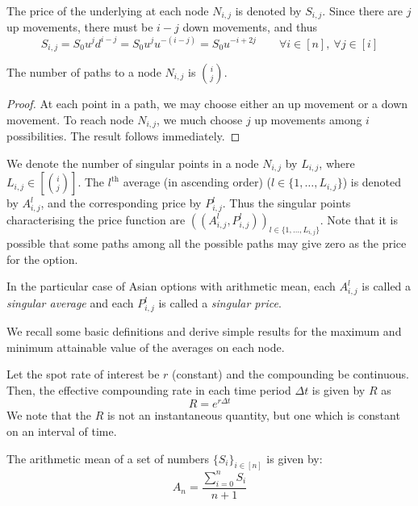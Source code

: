 The price of the underlying at each node $ N_{i,j} $ is denoted by $ S_{i,j} $. Since there are $j$ up movements, there must be $ i-j $ down movements, and thus
\begin{equation} \label{eq:asian-am-ij}
	S_{i,j} = S_0 u^{j} d^{i-j} = S_0 u^{j} u^{-(i-j)} = S_0 u^{-i+2j} \qquad \forall i \in [n], \ \forall j \in [i]
\end{equation}


\begin{prp}
	The number of paths to a node $ N_{i,j} $ is $ \binom{i}{j} $.
\end{prp}

\begin{proof}
	At each point in a path, we may choose either an up movement or a down movement. To reach node $ N_{i,j} $, we much choose $j$ up movements among $i$ possibilities. The result follows immediately.
\end{proof}


We denote the number of singular points in a node $ N_{i,j} $ by $ L_{i,j} $, where $ L_{i,j} \in \left[ \binom{i}{j} \right] $. The $ l^\mathrm{th} $ average (in ascending order) ($ l \in \{ 1, \dots, L_{i,j} \} $) is denoted by $ A_{i,j}^l $, and the corresponding price by $ P_{i,j}^l $. Thus the singular points characterising the price function are $ ( ( A_{i,j}^l, P_{i,j}^l ) )_{l \in \{ 1, \dots, L_{i,j} \} } $. Note that it is possible that some paths among all the possible paths may give zero as the price for the option. 


\begin{dfn}
	In the particular case of Asian options with arithmetic mean, each $ A_{i,j}^l $ is called a \emph{singular average} and each $ P_{i,j}^l $ is called a  \emph{singular price}.
\end{dfn}


We recall some basic definitions and derive simple results for the maximum and minimum attainable value of the averages on each node.

Let the spot rate of interest be $ r $ (constant) and the compounding be continuous. Then, the effective compounding rate in each time period $ \Delta t $ is given by $ R $ as
\begin{equation}
	\label{eq:R}
	R = e^{r \Delta t}
\end{equation}
We note that the $R$ is not an instantaneous quantity, but one which is constant on an interval of time.


\begin{dfn}
	The arithmetic mean of a set of numbers $ \{ S_i \}_{i \in [n]} $ is given by:
	\begin{equation}
		\label{eq:am}
		A_{n} = \frac{\sum_{i=0}^n S_i}{n+1}
	\end{equation}
\end{dfn}

